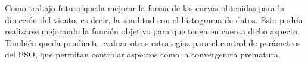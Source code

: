 Como trabajo futuro queda mejorar la forma de las curvas obtenidas para la dirección del viento, es decir, la similitud con el histograma de datos. Esto podría realizarse mejorando la función objetivo para que tenga en cuenta dicho aspecto. También queda pendiente evaluar otras estrategias para el control de parámetros del PSO, que permitan controlar aspectos como la convergencia prematura.\\
